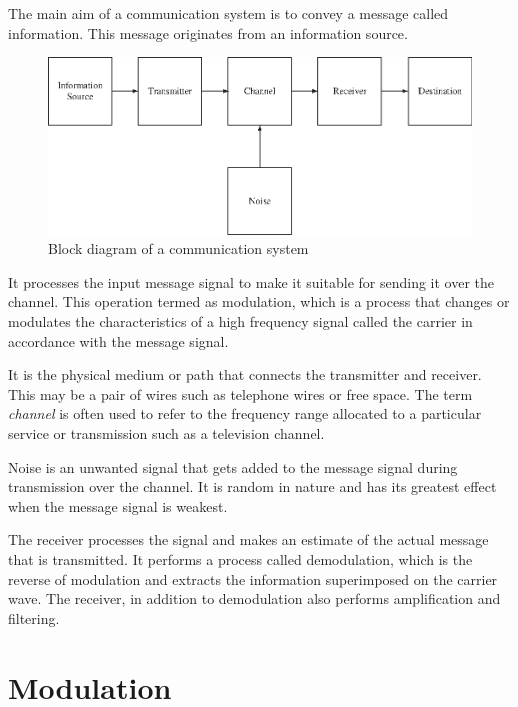 The main aim of a communication system is to convey a message called information. This message originates from an information source.
\begin{figure}[H]
\centering
\includegraphics{chap9/S3-EE-07-002.eps}
\caption{Block diagram of a communication system}\label{fig9.1}
\end{figure}

\smallskip
{}
It processes the input message signal to make it suitable for sending it over the channel. This operation termed as modulation, which is a process that changes or modulates the characteristics of a high frequency signal called the carrier in accordance with the message signal.

\smallskip
{}
It is the physical medium or path that connects the transmitter and receiver. This may be a pair of wires such as telephone wires or free space. The term {\em channel} is often used to refer to the frequency range allocated to a particular service or transmission such as a television channel.

\smallskip
{}
Noise is an unwanted signal that gets added to the message signal during transmission over the channel. It is random in nature and has its greatest effect when the message signal is weakest.

\smallskip
{}
The receiver processes the signal and makes an estimate of the actual message that is transmitted. It performs a process called demodulation, which is the reverse of modulation and extracts the information superimposed on the carrier wave. The receiver, in addition to demodulation also performs amplification and filtering. 

\section{Modulation}\label{sec9.3}

